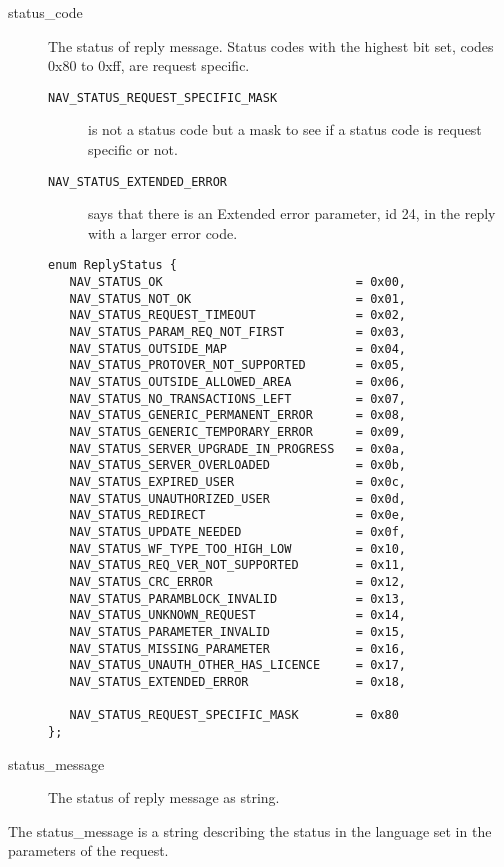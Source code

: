 \documentclass[a4paper]{article}
\begin{document}
\begin{description}
   \item[status\_code] The status of reply message.  Status codes with
     the highest bit set, codes 0x80 to 0xff, are request specific.
     \begin{description}
     \item[{\tt NAV\_STATUS\_REQUEST\_SPECIFIC\_MASK}] is not a status
       code but a mask to see if a status code is request specific or
       not.  
     \item[{\tt NAV\_STATUS\_EXTENDED\_ERROR}] says that there is an
       Extended error parameter, id 24, in the reply with a larger
       error code.
     \end{description}

\begin{verbatim}
enum ReplyStatus {
   NAV_STATUS_OK                           = 0x00,
   NAV_STATUS_NOT_OK                       = 0x01,
   NAV_STATUS_REQUEST_TIMEOUT              = 0x02,
   NAV_STATUS_PARAM_REQ_NOT_FIRST          = 0x03,
   NAV_STATUS_OUTSIDE_MAP                  = 0x04,
   NAV_STATUS_PROTOVER_NOT_SUPPORTED       = 0x05,
   NAV_STATUS_OUTSIDE_ALLOWED_AREA         = 0x06,
   NAV_STATUS_NO_TRANSACTIONS_LEFT         = 0x07,
   NAV_STATUS_GENERIC_PERMANENT_ERROR      = 0x08,
   NAV_STATUS_GENERIC_TEMPORARY_ERROR      = 0x09,
   NAV_STATUS_SERVER_UPGRADE_IN_PROGRESS   = 0x0a,
   NAV_STATUS_SERVER_OVERLOADED            = 0x0b,
   NAV_STATUS_EXPIRED_USER                 = 0x0c,
   NAV_STATUS_UNAUTHORIZED_USER            = 0x0d,
   NAV_STATUS_REDIRECT                     = 0x0e,
   NAV_STATUS_UPDATE_NEEDED                = 0x0f,
   NAV_STATUS_WF_TYPE_TOO_HIGH_LOW         = 0x10,
   NAV_STATUS_REQ_VER_NOT_SUPPORTED        = 0x11,
   NAV_STATUS_CRC_ERROR                    = 0x12,
   NAV_STATUS_PARAMBLOCK_INVALID           = 0x13,
   NAV_STATUS_UNKNOWN_REQUEST              = 0x14,
   NAV_STATUS_PARAMETER_INVALID            = 0x15,
   NAV_STATUS_MISSING_PARAMETER            = 0x16,
   NAV_STATUS_UNAUTH_OTHER_HAS_LICENCE     = 0x17,
   NAV_STATUS_EXTENDED_ERROR               = 0x18,
      
   NAV_STATUS_REQUEST_SPECIFIC_MASK        = 0x80
};
\end{verbatim}

   \item[status\_message] The status of reply message as string.
\end{description}

The status\_message is a string describing the status in the
language set in the parameters of the request.
\end{document}
